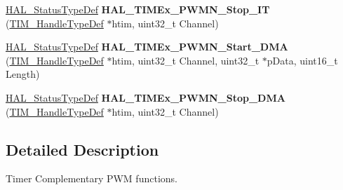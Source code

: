\begin{DoxyCompactItemize}
\hyperlink{stm32f4xx__hal__def_8h_a63c0679d1cb8b8c684fbb0632743478f}{H\+A\+L\+\_\+\+Status\+Type\+Def} {\bfseries H\+A\+L\+\_\+\+T\+I\+M\+Ex\+\_\+\+P\+W\+M\+N\+\_\+\+Stop\+\_\+\+IT} (\hyperlink{struct_t_i_m___handle_type_def}{T\+I\+M\+\_\+\+Handle\+Type\+Def} $\ast$htim, uint32\+\_\+t Channel)
\item 
\mbox{\label{group___t_i_m_ex___exported___functions___group3_gac525533dc108ee4915ca93d5a43cb3b5}} 
\hyperlink{stm32f4xx__hal__def_8h_a63c0679d1cb8b8c684fbb0632743478f}{H\+A\+L\+\_\+\+Status\+Type\+Def} {\bfseries H\+A\+L\+\_\+\+T\+I\+M\+Ex\+\_\+\+P\+W\+M\+N\+\_\+\+Start\+\_\+\+D\+MA} (\hyperlink{struct_t_i_m___handle_type_def}{T\+I\+M\+\_\+\+Handle\+Type\+Def} $\ast$htim, uint32\+\_\+t Channel, uint32\+\_\+t $\ast$p\+Data, uint16\+\_\+t Length)
\item 
\mbox{\label{group___t_i_m_ex___exported___functions___group3_ga10afdfdc5eed2e0288ccb969f48bc0e4}} 
\hyperlink{stm32f4xx__hal__def_8h_a63c0679d1cb8b8c684fbb0632743478f}{H\+A\+L\+\_\+\+Status\+Type\+Def} {\bfseries H\+A\+L\+\_\+\+T\+I\+M\+Ex\+\_\+\+P\+W\+M\+N\+\_\+\+Stop\+\_\+\+D\+MA} (\hyperlink{struct_t_i_m___handle_type_def}{T\+I\+M\+\_\+\+Handle\+Type\+Def} $\ast$htim, uint32\+\_\+t Channel)
\end{DoxyCompactItemize}


\subsection{Detailed Description}
Timer Complementary P\+WM functions. 

